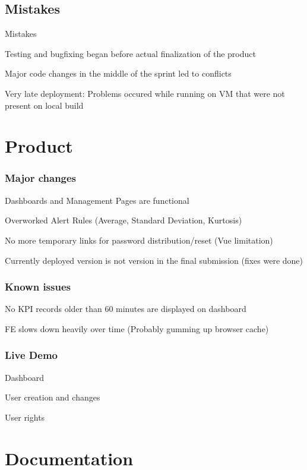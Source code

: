 \documentclass[aspectratio=1610,20pt,utf8]{beamer}
\begin{document}
\subsection{Mistakes}
\begin{frame}{Mistakes}
 \itemize
 \item Testing and bugfixing began before actual finalization of the product
 \item Major code changes in the middle of the sprint led to conflicts
 \item Very late deployment: Problems occured while running on VM that were not present on local build
 
\end{frame}
\section{Product}
\begin{frame}
\frametitle{Major changes}
\itemize
\item Dashboards and Management Pages are functional
\item Overworked Alert Rules (Average, Standard Deviation, Kurtosis)
\item No more temporary links for password distribution/reset (Vue limitation)
\item Currently deployed version is not version in the final submission (fixes were done)
\end{frame}
\begin{frame}
\frametitle{Known issues}
\itemize
\item No KPI records older than 60 minutes are displayed on dashboard
\item FE slows down heavily over time (Probably gumming up browser cache)
\end{frame}
\begin{frame}
\frametitle{Live Demo}
\itemize
\item Dashboard
\item User creation and changes
\item User rights
\end{frame}

\section{Documentation}
\end{document}
